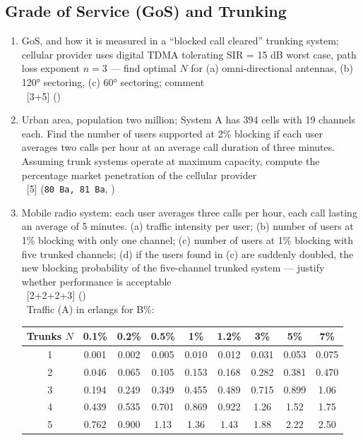 \documentclass[12pt]{article}
\newcommand{\enter}{\\\textcolor{white}{1}}
\begin{document}
  \subsection{Grade of Service (GoS) and Trunking}
    \begin{enumerate}[topsep=0pt, noitemsep]
      \item GoS, and how it is measured in a ``blocked call cleared'' trunking system;
        cellular provider uses digital TDMA tolerating SIR = 15 dB worst case,
        path loss exponent $n = 3$ --- find optimal $N$ for
        (a) omni-directional antennas, (b) 120° sectoring, (c) 60° sectoring; comment
        \enter\hfill [3+5] ()
      \item Urban area, population two million; System A has 394 cells with 19 channels each.
        Find the number of users supported at 2\% blocking if each user averages two calls per
        hour at an average call duration of three minutes. Assuming trunk systems operate at
        maximum capacity, compute the percentage market penetration of the cellular provider
        \enter\hfill [5] (\texttt{80 Ba, 81 Ba}, )
      \item Mobile radio system: each user averages three calls per hour, each call lasting
        an average of 5 minutes. (a) traffic intensity per user; (b) number of users at 1\%
        blocking with only one channel; (c) number of users at 1\% blocking with five trunked
        channels; (d) if the users found in (c) are suddenly doubled, the new blocking
        probability of the five-channel trunked system --- justify whether performance is acceptable
        \enter\hfill [2+2+2+3] ()
        \enter Traffic (A) in erlangs for B\%:
        \begin{center}\small
        \begin{tabular}{|c|c|c|c|c|c|c|c|c|}
        \hline
        Trunks $N$ & 0.1\% & 0.2\% & 0.5\% & 1\% & 1.2\% & 3\% & 5\% & 7\% \\ \hline
        1 & 0.001 & 0.002 & 0.005 & 0.010 & 0.012 & 0.031 & 0.053 & 0.075 \\ \hline
        2 & 0.046 & 0.065 & 0.105 & 0.153 & 0.168 & 0.282 & 0.381 & 0.470 \\ \hline
        3 & 0.194 & 0.249 & 0.349 & 0.455 & 0.489 & 0.715 & 0.899 & 1.06 \\ \hline
        4 & 0.439 & 0.535 & 0.701 & 0.869 & 0.922 & 1.26 & 1.52 & 1.75 \\ \hline
        5 & 0.762 & 0.900 & 1.13 & 1.36 & 1.43 & 1.88 & 2.22 & 2.50 \\ \hline

\end{tabular}
\end{center}
\end{enumerate}
\end{document}
